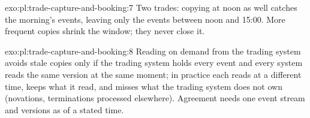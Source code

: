 \begin{solution}{exo:pl:trade-capture-and-booking:7}
Two trades: copying at noon as well catches the morning's events, leaving only the events between noon and 15:00. More frequent copies shrink the
window; they never close it.
\end{solution}

\begin{solution}{exo:pl:trade-capture-and-booking:8}
Reading on demand from the trading system avoids stale copies only if the trading system holds every event and every system reads the same
version at the same moment; in practice each reads at a different time, keeps what it read, and misses what the trading system does not own
(novations, terminations processed elsewhere). Agreement needs one event stream and versions as of a stated time.
\end{solution}

